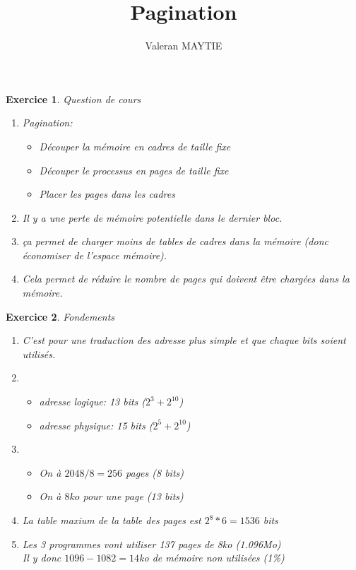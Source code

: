 \documentclass{article}
\title{\textbf{Pagination}}
\date{}
\author{Valeran MAYTIE}
\theoremstyle{plain}
\newtheorem{exo}{Exercice}%
\begin{document}
\maketitle

\begin{exo} Question de cours
\begin{enumerate}
    \item Pagination:\begin{itemize}
        \item Découper la mémoire en cadres de taille fixe
        \item Découper le processus en pages de taille fixe
        \item Placer les pages dans les cadres
    \end{itemize}

    \item Il y a une perte de mémoire potentielle dans le dernier bloc.
    \item ça permet de charger moins de tables de cadres dans la mémoire (donc économiser de l'espace mémoire).
    \item  Cela permet de réduire le nombre de pages qui doivent être chargées dans la mémoire.
\end{enumerate}
\end{exo}

\begin{exo} Fondements
\begin{enumerate}
    \item C'est pour une traduction des adresse plus simple et que chaque bits soient utilisés.
    \item \begin{itemize}
        \item adresse logique: 13 bits ($2^3 + 2^{10}$)
        \item adresse physique: 15 bits ($2^5 + 2^{10}$)
    \end{itemize}
    \item \begin{itemize}
        \item On à $2048 / 8 = 256$ pages (8 bits) 
        \item On à $8ko$ pour une page (13 bits)
    \end{itemize} 
    \item La table maxium de la table des pages est $2^8 * 6 = 1536$ bits
    \item Les 3 programmes vont utiliser 137 pages de 8ko (1.096Mo)\\
    Il y donc $1096 - 1082 = 14$ko de mémoire non utilisées (1\%)
\end{enumerate}
\end{exo}
\end{document}
